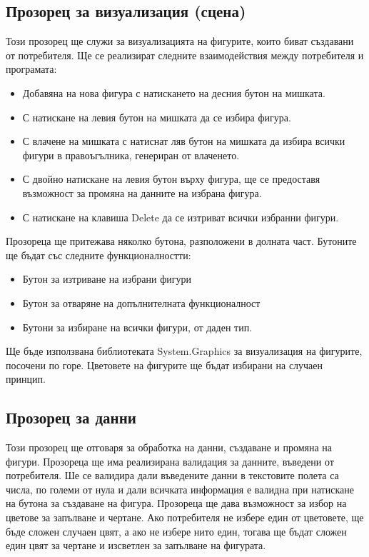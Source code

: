 \documentclass[a4paper,fleqn,12pt]{article}
\begin{document}
\subsection{Прозорец за визуализация (сцена)}
Този прозорец ще служи за визуализацията на фигурите, които биват създавани от потребителя. 
Ще се реализират следните взаимодействия между потребителя и програмата: 
\begin{itemize}
\item Добавяна на нова фигура с натискането на десния бутон на мишката. 
\item С натискане на левия бутон на мишката да се избира фигура.
\item С влачене на мишката с натиснат ляв бутон на мишката да избира всички фигури в правоъгълника, генериран от влаченето. 
\item С двойно натискане на левия бутон върху фигура, ще се предоставя възможност за промяна на данните на избрана фигура.
\item С натискане на клавиша Delete да се изтриват всички избранни фигури. 
\end{itemize}
Прозореца ще притежава няколко бутона, разположени в долната част.
Бутоните ще бъдат със следните функционалностти: 
\begin{itemize}
\item Бутон за изтриване на избрани фигури
\item Бутон за отваряне на допълнителната функционалност
\item Бутони за избиране на всички фигури, от даден тип. 
\end{itemize}
Ще бъде използвана библиотеката System.Graphics за визуализация на фигурите, посочени по горе.
Цветовете на фигурите ще бъдат избирани на случаен принцип. 

\subsection{Прозорец за данни}
Този прозорец ще отговаря за обработка на данни, създаване и промяна на фигури. 
Прозореца ще има реализирана валидация за данните, въведени от потребителя.
Ше се валидира дали въведените данни в текстовите полета са числа, по големи от нула и дали всичката информация е валидна при натискане на бутона за създаване на фигура. 
Прозореца ще дава възможност за избор на цветове за запълване и чертане. 
Ако потребителя не избере един от цветовете, ще бъде сложен случаен цвят, а ако не избере нито един, тогава ще бъдат сложен един цвят за чертане и изсветлен за запълване на фигурата. 
\end{document}
